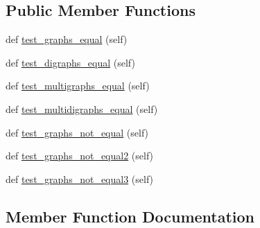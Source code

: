 \subsection*{Public Member Functions}
\begin{DoxyCompactItemize}
\item 
def \hyperlink{classnetworkx_1_1testing_1_1tests_1_1test__utils_1_1TestGraphsEqual_afe9c4a9679ff85b556d319a0206af543}{test\+\_\+graphs\+\_\+equal} (self)
\item 
def \hyperlink{classnetworkx_1_1testing_1_1tests_1_1test__utils_1_1TestGraphsEqual_a82b378fee9808645c7f27bf2ad71f805}{test\+\_\+digraphs\+\_\+equal} (self)
\item 
def \hyperlink{classnetworkx_1_1testing_1_1tests_1_1test__utils_1_1TestGraphsEqual_aec027194be31ccf2f614d86e7e51e31f}{test\+\_\+multigraphs\+\_\+equal} (self)
\item 
def \hyperlink{classnetworkx_1_1testing_1_1tests_1_1test__utils_1_1TestGraphsEqual_a1dbae112043d6cb7e0d067ed8a9807b4}{test\+\_\+multidigraphs\+\_\+equal} (self)
\item 
def \hyperlink{classnetworkx_1_1testing_1_1tests_1_1test__utils_1_1TestGraphsEqual_a7a79e397c0a7c12aa1b0319c40a7e546}{test\+\_\+graphs\+\_\+not\+\_\+equal} (self)
\item 
def \hyperlink{classnetworkx_1_1testing_1_1tests_1_1test__utils_1_1TestGraphsEqual_aaa35880c5b9b5847fb7e6c0ea2afef0b}{test\+\_\+graphs\+\_\+not\+\_\+equal2} (self)
\item 
def \hyperlink{classnetworkx_1_1testing_1_1tests_1_1test__utils_1_1TestGraphsEqual_aeec42ca1aef5b3e91a2b7a852fc06e2c}{test\+\_\+graphs\+\_\+not\+\_\+equal3} (self)
\end{DoxyCompactItemize}


\subsection{Member Function Documentation}
\mbox{\label{classnetworkx_1_1testing_1_1tests_1_1test__utils_1_1TestGraphsEqual_a82b378fee9808645c7f27bf2ad71f805}} 
